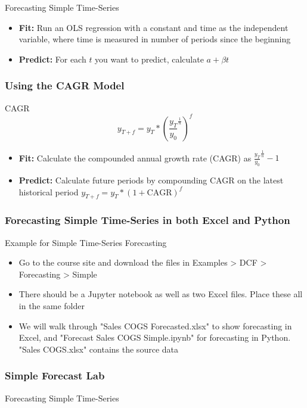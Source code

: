 \documentclass[handout, 11pt]{beamer}
\begin{document}
\begin{section}{Forecasting Simple Time-Series}
\begin{frame}
\vfill
\begin{itemize}
\item \textbf{Fit:}
Run an OLS regression with a constant and time as the independent variable, where time is measured in number of periods since the beginning
\vfill
\item \textbf{Predict:}
For each $t$ you want to predict, calculate $a + \beta t$
\end{itemize}
\end{frame}
\begin{frame}
\frametitle{Using the CAGR Model}
\begin{block}{CAGR}
\begin{equation}
	y_{{T + f}} = y_T * (\frac{y_T}{y_0}^{\frac{1}{n}})^f
\end{equation}
\end{block}
\vfill
\begin{itemize}
\item \textbf{Fit:}
Calculate the compounded annual growth rate (CAGR) as
$\frac{y_T}{y_0}^{\frac{1}{n}} - 1$
\vfill
\item \textbf{Predict:}
Calculate future periods by compounding CAGR on the latest historical period
$y_{T + f} = y_T * (1 + \text{CAGR})^f$
\end{itemize}
\end{frame}
\begin{frame}
\frametitle{Forecasting Simple Time-Series in both Excel and Python}
{
\begin{block}{Example for Simple Time-Series Forecasting}
\begin{itemize}
\item Go to the course site and download the files in Examples > DCF > Forecasting > Simple
\item There should be a Jupyter notebook as well as two Excel files. Place these all in the same folder
\item We will walk through "Sales COGS Forecasted.xlsx" to show forecasting in Excel, and "Forecast Sales COGS Simple.ipynb" for forecasting in Python. "Sales COGS.xlsx" contains the source data
\end{itemize}
\end{block}
}
\end{frame}
\begin{frame}
\frametitle{Simple Forecast Lab}
{
\begin{block}{Forecasting Simple Time-Series}
\begin{enumerate}

\end{enumerate}
\end{block}}
\end{frame}
\end{section}
\end{document}
